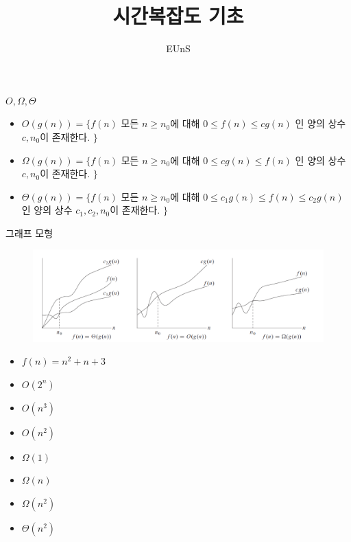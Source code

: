 \documentclass[10pt]{beamer}
\title{시간복잡도 기초}
\author{EUnS}
\begin{document}
\begin{frame}{}
    \maketitle
\end{frame}    


\begin{frame}{$O, \Omega, \Theta$}
    \begin{itemize}
        \item $O(g(n)) = \{ f(n)$ 모든 $n \ge n_0$에 대해 $0 \le f(n) \le cg(n)$ 인 양의 상수 $c, n_0$이 존재한다. $\}$
        \pause
        \item $\Omega(g(n)) = \{ f(n)$ 모든 $n \ge n_0$에 대해 $0 \le  cg(n) \le f(n)$ 인 양의 상수 $c, n_0$이 존재한다. $\}$
        \pause
        \item $\Theta(g(n)) = \{ f(n)$ 모든 $n \ge n_0$에 대해 $0 \le  c_1 g(n) \le f(n) \le c_2g(n)$ 인 양의 상수 $c_1, c_2, n_0$이 존재한다. $\}$
    \end{itemize}
\end{frame}


\begin{frame}{그래프 모형}
    \begin{figure}[h!]
        \centering
        \includegraphics[scale=0.3]{pic1.PNG}
    \end{figure}
\end{frame}    



\begin{frame}{ex}
    \begin{itemize}
        \item $f(n) = n^2 + n + 3$
        \pause
        \item $O(2^n)$
        \pause
        \item $O(n^3)$
        \pause
        \item $O(n^2)$
        \pause
        \item $\Omega(1)$
        \pause
        \item $\Omega(n)$
        \pause
        \item $\Omega(n^2)$
        \pause
        \item $\Theta(n^2)$
    \end{itemize}
\end{frame}    
\end{document}
